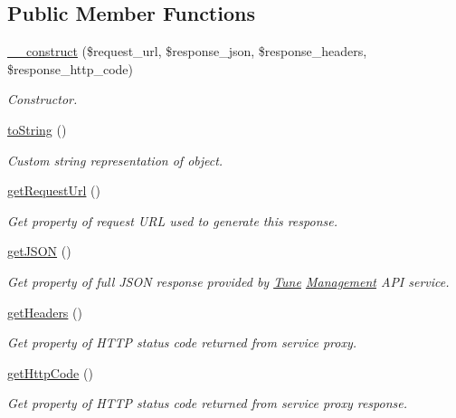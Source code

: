 \subsection*{Public Member Functions}
\begin{DoxyCompactItemize}
\item 
\hyperlink{classTune_1_1Management_1_1Service_1_1Response_ae82bcdd099bf18a31aba16486a8b8454}{\-\_\-\-\_\-construct} (\$request\-\_\-url, \$response\-\_\-json, \$response\-\_\-headers, \$response\-\_\-http\-\_\-code)
\begin{DoxyCompactList}\small\item\em Constructor. \end{DoxyCompactList}\item 
\hyperlink{classTune_1_1Management_1_1Service_1_1Response_ad03514e776620bd3e41da951325db7fe}{to\-String} ()
\begin{DoxyCompactList}\small\item\em Custom string representation of object. \end{DoxyCompactList}\item 
\hyperlink{classTune_1_1Management_1_1Service_1_1Response_a28f9b33df0ccba724a99a1b0966fd269}{get\-Request\-Url} ()
\begin{DoxyCompactList}\small\item\em Get property of request U\-R\-L used to generate this response. \end{DoxyCompactList}\item 
\hyperlink{classTune_1_1Management_1_1Service_1_1Response_a27b33ced317cef332ffdba1d5ff0908f}{get\-J\-S\-O\-N} ()
\begin{DoxyCompactList}\small\item\em Get property of full J\-S\-O\-N response provided by \hyperlink{namespaceTune}{Tune} \hyperlink{namespaceTune_1_1Management}{Management} A\-P\-I service. \end{DoxyCompactList}\item 
\hyperlink{classTune_1_1Management_1_1Service_1_1Response_aff2faf286e8f0dbed18438e1874a01e8}{get\-Headers} ()
\begin{DoxyCompactList}\small\item\em Get property of H\-T\-T\-P status code returned from service proxy. \end{DoxyCompactList}\item 
\hyperlink{classTune_1_1Management_1_1Service_1_1Response_adb61b5f1256dc22ccbc86c02c401c1d5}{get\-Http\-Code} ()
\begin{DoxyCompactList}\small\item\em Get property of H\-T\-T\-P status code returned from service proxy response. \end{DoxyCompactList}\item 

\end{DoxyCompactItemize}
